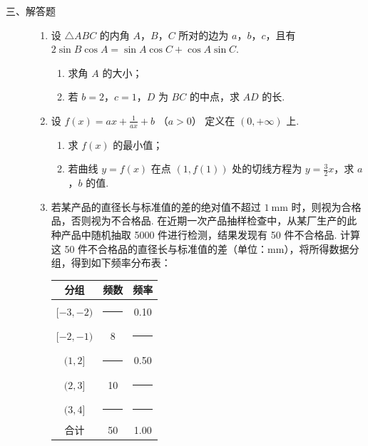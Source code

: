 \begin{description}

    \item[三、解答题]

    \begin{enumerate}[leftmargin=5pt]

      \addtocounter{enumi}{+15}

        \item 设 \(\triangle ABC\) 的内角 \(A\)，\(B\)，\(C\) 所对的边为 \(a\)，\(b\)，\(c\)，且有 \(2\sin B\cos A = \sin A\cos C + \cos A\sin C\).

\begin{enumerate}
\item 求角 \(A\) 的大小；
\item 若 \(b = 2\)，\(c = 1\)，\(D\) 为 \(BC\) 的中点，求 \(AD\) 的长.
\end{enumerate}

        \item 设 \(f(x) = ax + \frac{1}{ax} + b\) （\(a > 0\)） 定义在 \((0, +\infty)\) 上.

\begin{enumerate}
\item 求 \(f(x)\) 的最小值；
\item 若曲线 \(y = f(x)\) 在点 \((1, f(1))\) 处的切线方程为 \(y = \frac{3}{2}x\)，求 \(a\)，\(b\) 的值.
\end{enumerate}

        \item 若某产品的直径长与标准值的差的绝对值不超过 \(1\mathrm{~mm}\) 时，则视为合格品，否则视为不合格品. 在近期一次产品抽样检查中，从某厂生产的此种产品中随机抽取 5000 件进行检测，结果发现有 50 件不合格品. 计算这 50 件不合格品的直径长与标准值的差（单位：mm），将所得数据分组，得到如下频率分布表：

\begin{center}
\begin{tabular}{c|c|c}
\hline
分组 & 频数 & 频率 \\
\hline
\([-3,-2)\) &\rule[-0.3ex]{3em}{0.4pt} & 0.10 \\
\([-2,-1)\) & 8 &\rule[-0.3ex]{3em}{0.4pt} \\
\((1,2]\) &\rule[-0.3ex]{3em}{0.4pt} & 0.50 \\
\((2,3]\) & 10 &\rule[-0.3ex]{3em}{0.4pt} \\
\((3,4]\) &\rule[-0.3ex]{3em}{0.4pt} &\rule[-0.3ex]{3em}{0.4pt} \\
\hline
合计 & 50 & 1.00 \\
\hline
\end{tabular}
\end{center}


\end{enumerate}
\end{description}
